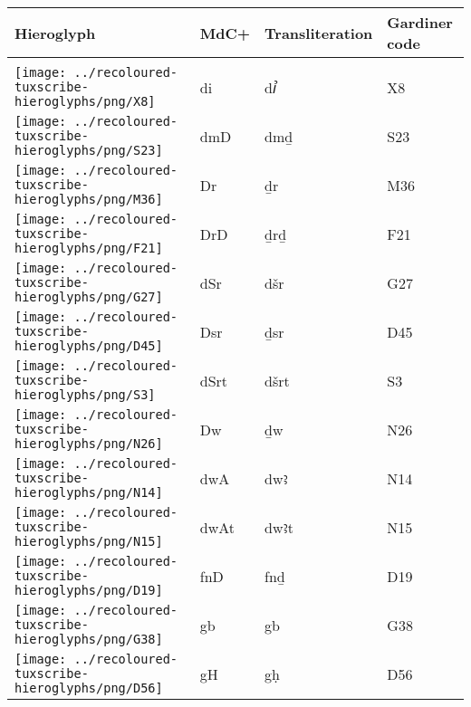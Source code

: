 \begin{center}
	\begin{tabularx}{\linewidth}{YYYY}
		Hieroglyph & MdC+ & Transliteration & Gardiner code\\
		\hline\\
		\texttt{[image: ../recoloured-tuxscribe-hieroglyphs/png/X8]} & di & dꞽ & X8 \\ 
		\texttt{[image: ../recoloured-tuxscribe-hieroglyphs/png/S23]} & dmD & dmḏ & S23 \\ 
		\texttt{[image: ../recoloured-tuxscribe-hieroglyphs/png/M36]} & Dr & ḏr & M36 \\ 
		\texttt{[image: ../recoloured-tuxscribe-hieroglyphs/png/F21]} & DrD & ḏrḏ & F21 \\ 
		\texttt{[image: ../recoloured-tuxscribe-hieroglyphs/png/G27]} & dSr & dšr & G27 \\ 
		\texttt{[image: ../recoloured-tuxscribe-hieroglyphs/png/D45]} & Dsr & ḏsr & D45 \\ 
		\texttt{[image: ../recoloured-tuxscribe-hieroglyphs/png/S3]} & dSrt & dšrt & S3 \\ 
		\texttt{[image: ../recoloured-tuxscribe-hieroglyphs/png/N26]} & Dw & ḏw & N26 \\ 
		\texttt{[image: ../recoloured-tuxscribe-hieroglyphs/png/N14]} & dwA & dwꜣ & N14 \\ 
		\texttt{[image: ../recoloured-tuxscribe-hieroglyphs/png/N15]} & dwAt & dwꜣt & N15 \\ 
		\texttt{[image: ../recoloured-tuxscribe-hieroglyphs/png/D19]} & fnD & fnḏ & D19 \\ 
		\texttt{[image: ../recoloured-tuxscribe-hieroglyphs/png/G38]} & gb & gb & G38 \\ 
		\texttt{[image: ../recoloured-tuxscribe-hieroglyphs/png/D56]} & gH & gḥ & D56 \\ 
	\end{tabularx}
\end{center}


